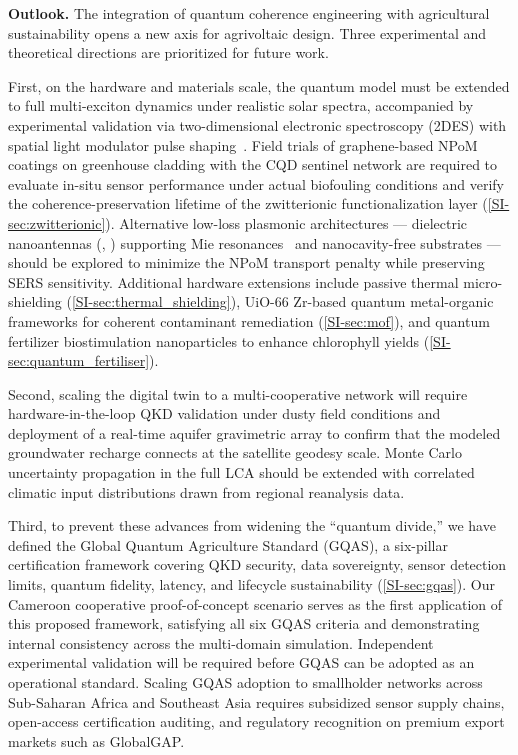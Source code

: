\documentclass[onecolumn,a4paper,12pt]{article}
\begin{document}
\textbf{Outlook.} The integration of quantum coherence engineering with agricultural sustainability opens a new axis for agrivoltaic design. Three experimental and theoretical directions are prioritized for future work.

First, on the hardware and materials scale, the quantum model must be extended to full multi-exciton dynamics under realistic solar spectra, accompanied by experimental validation via two-dimensional electronic spectroscopy (2DES) with spatial light modulator pulse shaping~\cite{Gunthardt2023,Sebastian2024}. Field trials of graphene-based NPoM coatings on greenhouse cladding with the CQD sentinel network are required to evaluate in-situ sensor performance under actual biofouling conditions and verify the coherence-preservation lifetime of the zwitterionic functionalization layer (\cref{SI-sec:zwitterionic}). Alternative low-loss plasmonic architectures --- dielectric nanoantennas (, ) supporting Mie resonances~\cite{Caldarola2015} and nanocavity-free substrates --- should be explored to minimize the NPoM transport penalty while preserving SERS sensitivity. Additional hardware extensions include passive thermal micro-shielding (\cref{SI-sec:thermal_shielding}), UiO-66 Zr-based quantum metal-organic frameworks for coherent contaminant remediation (\cref{SI-sec:mof}), and quantum fertilizer biostimulation nanoparticles to enhance chlorophyll yields (\cref{SI-sec:quantum_fertiliser}).

Second, scaling the digital twin to a multi-cooperative network will require hardware-in-the-loop QKD validation under dusty field conditions and deployment of a real-time aquifer gravimetric array to confirm that the modeled groundwater recharge connects at the satellite geodesy scale. Monte Carlo uncertainty propagation in the full LCA should be extended with correlated climatic input distributions drawn from regional reanalysis data.

Third, to prevent these advances from widening the ``quantum divide,'' we have defined the Global Quantum Agriculture Standard (GQAS), a six-pillar certification framework covering QKD security, data sovereignty, sensor detection limits, quantum fidelity, latency, and lifecycle sustainability (\cref{SI-sec:gqas}). Our Cameroon cooperative proof-of-concept scenario serves as the first application of this proposed framework, satisfying all six GQAS criteria and demonstrating internal consistency across the multi-domain simulation. Independent experimental validation will be required before GQAS can be adopted as an operational standard. Scaling GQAS adoption to smallholder networks across Sub-Saharan Africa and Southeast Asia requires subsidized sensor supply chains, open-access certification auditing, and regulatory recognition on premium export markets such as GlobalGAP.
\end{document}
